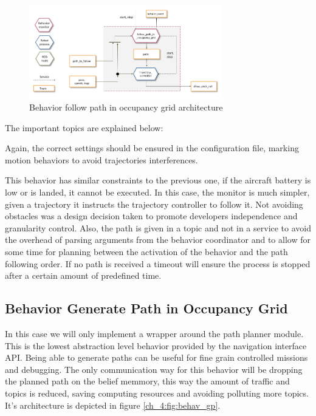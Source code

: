   \begin{figure}[h]
    \centering
    \includegraphics[width=0.75\textwidth]{./Figures/BehaviorFPArquitecture.png}
    \caption{Behavior follow path in occupancy grid architecture}
    \label{ch_4:fig:behav_fp}
  \end{figure}

  The important topics are explained below:

  

  Again, the correct settings should be ensured in the configuration file, marking motion behaviors to avoid trajectories interferences.

  This behavior has similar constraints to the previous one, if the aircraft battery is low or is landed, it cannot be executed. In this case, the monitor is much simpler, given a trajectory it instructs the trajectory controller to follow it. Not avoiding obstacles was a design decision taken to promote developers independence and granularity control. Also, the path is given in a topic and not in a service to avoid the overhead of parsing arguments from the behavior coordinator and to allow for some time for planning between the activation of the behavior and the path following order. If no path is received a timeout will ensure the process is stopped after a certain amount of predefined time.

\clearpage

\subsection{Behavior Generate Path in Occupancy Grid} \label{ch_4:subsect:behav_gpog}

  In this case we will only implement a wrapper around the path planner module. This is the lowest abstraction level behavior provided by the navigation interface API. Being able to generate paths can be useful for fine grain controlled missions and debugging. The only communication way for this behavior will be dropping the planned path on the belief memmory, this way the amount of traffic and topics is reduced, saving computing resources and avoiding polluting more topics. It's architecture is depicted in figure \ref{ch_4:fig:behav_gp}.

